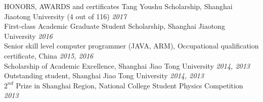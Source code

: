 \documentclass{resume} %
\begin{document}
\begin{rSection}{HONORS, AWARDS and certificates}
Tang Youshu Scholarship, Shanghai Jiaotong University (4 out of 116) \hfill \emph{2017}
\\First-class Academic Graduate Student Scholarship, Shanghai Jiaotong University  \hfill \emph{2016}
\\Senior skill level computer programmer (JAVA, ARM), Occupational qualification certificate, China \hfill \emph{2015, 2016}
\\Scholarship of Academic Excellence, Shanghai Jiao Tong University \hfill \emph{2014, 2013}
\\Outstanding student, Shanghai Jiao Tong University \hfill \emph{2014, 2013}
\\$2^{nd}$ Prize in Shanghai Region, National College Student Physics Competition \hfill \emph{2013}
\end{rSection}





\end{document}
